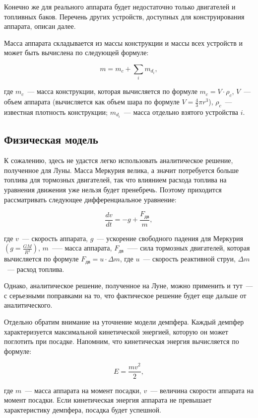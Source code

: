 \documentclass[12pt,a4paper]{article}
\begin{document}
Конечно же для реального аппарата будет недостаточно только двигателей и топливных
баков. Перечень других устройств, доступных для конструирования аппарата, описан далее.

Масса аппарата складывается из массы конструкции и массы всех устройств и может быть
вычислена по следующей формуле:

$$
m = m_c + \sum\limits_{i}m_{d_i},
$$

где $m_c$~--- масса конструкции, которая вычисляется по формуле $m_c = V \cdot \rho_c$,
$V$~--- объем аппарата (вычисляется как объем шара по формуле $V = \frac{4}{3} \pi
r^3$), $\rho_c$~--- известная плотность конструкции; $m_{d_i}$~--- масса отдельно взятого
устройства $i$.

\subsection{Физическая модель}

К сожалению, здесь не удастся легко использовать аналитическое решение, полученное для
Луны. Масса Меркурия велика, а значит потребуется больше топлива для тормозных двигателей,
так что влиянием расхода топлива на уравнения движения уже нельзя будет
пренебречь. Поэтому приходится рассматривать следующее дифференциальное уравнение:

$$
\frac{dv}{dt} = -g + \frac{F_{\text{дв}}}{m},
$$

где $v$~--- скорость аппарата, $g$~--- ускорение свободного падения для Меркурия $\left(g
= \frac{G M}{R^2}\right)$, $m$~—-- масса аппарата, $F_{\text{дв}}$~--— сила тормозных
двигателей, которая вычисляется по формуле $F_{\text{дв}} = u \cdot \Delta m$, где $u$~---
скорость реактивной струи, $\Delta m$~--- расход топлива.

Однако, аналитическое решение, полученное на Луне, можно применить и тут~--- с серьезными
поправками на то, что фактическое решение будет еще дальше от аналитического.

Отдельно обратим внимание на уточнение модели демпфера. Каждый демпфер характеризуется
максимальной кинетической энергией, которую он может поглотить при посадке. Напомним, что
кинетическая энергия вычисляется по формуле:

$$
E = \frac{m v^2}{2},
$$

где $m$~--- масса аппарата на момент посадки, $v$~--- величина скорости аппарата на момент
посадки. Если кинетическая энергия аппарата не превышает характеристику демпфера, посадка
будет успешной.
\end{document}
